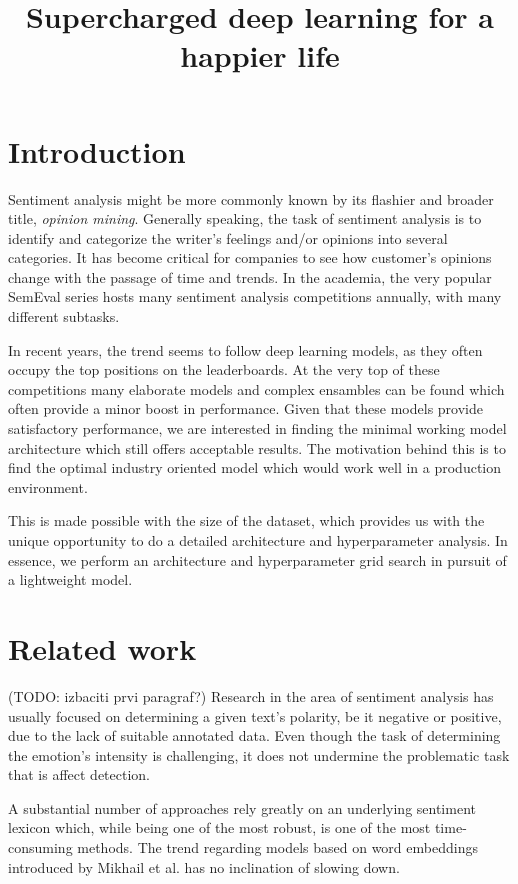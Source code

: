 \documentclass[10pt, a4paper]{article}
\title{Supercharged deep learning for a happier life}
\begin{document}
\maketitleabstract

\section{Introduction}

Sentiment analysis might be more commonly known by its flashier and broader title, \textit{opinion mining}. 
Generally speaking, the task of sentiment analysis is to identify and categorize the writer's feelings and/or opinions into several categories. 
It has become critical for companies to see how customer's opinions change with the passage of time and trends. 
In the academia, the very popular SemEval series hosts many sentiment analysis competitions annually, with many different subtasks.

In recent years, the trend seems to follow deep learning models,
as they often occupy the top positions on the leaderboards.
At the very top of these competitions many elaborate models 
and complex ensambles can be found
which often provide a minor boost in performance.
Given that these models provide satisfactory performance,
we are interested in finding the minimal working model architecture
which still offers acceptable results.
The motivation behind this is to find the optimal industry oriented
model which would work well in a production environment.

This is made possible with the size of the dataset,
which provides us with the unique opportunity to do a detailed
architecture and hyperparameter analysis.
In essence, we perform an architecture and hyperparameter grid
search in pursuit of a lightweight model.

\section{Related work}
(TODO: izbaciti prvi paragraf?)
Research in the area of sentiment analysis has usually focused on determining a 
given text's polarity, be it negative or positive, due to the lack of suitable annotated data.
Even though the task of determining the emotion's intensity is challenging,
it does not undermine the problematic task that is affect detection.

A substantial number of approaches rely greatly on an underlying sentiment lexicon which, while being one of the most robust, is one of the most time-consuming methods. The trend regarding models based on word embeddings introduced by Mikhail et al. has no inclination of slowing down. 
\end{document}
